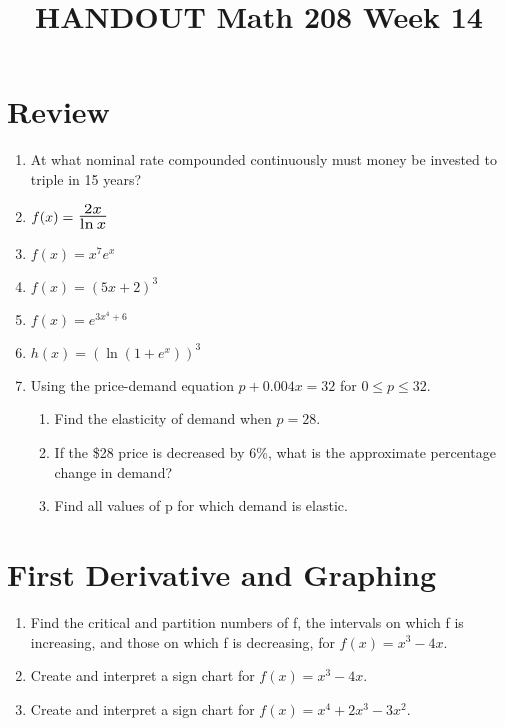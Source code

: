 \documentclass[14pt]{extarticle}
\title{\vspace{-5ex}HANDOUT Math 208 Week 14}
\date{\vspace{-10ex}}
\newcommand*{\Scale}[2][1.5]{\scalebox{#1}{\ensuremath{#2}}}%
\begin{document}
\maketitle		

\section{Review}
\begin{enumerate}
	\item At what nominal rate compounded continuously must money be invested to triple in 15 years?
	\vspace{3cm}

	\item $f(x) = \Scale[1.5]{\frac{2x}{\ln x}}$
	\vspace{4cm}
	
	\item $ f(x) = x^7e^x$
	\vspace{4cm}
	
	\item $f(x) = (5x+2)^3$
	\vspace{4cm}
	\cleardoublepage
	\item $f(x) = e^{3x^4+6}$
	\vspace{4cm}
	
	\item $h(x) = (\ln(1+e^x))^3$
	\vspace{5cm}
	
	\item Using the price-demand equation $p+0.004x = 32$ for $0 \leq p \leq 32$. 
	\begin{enumerate}
		\item Find the elasticity of demand when $p = 28$.
		\item If the \$28 price is decreased by 6\%, what is the approximate percentage change in demand?
		\item Find all values of p for which demand is elastic.
	\end{enumerate} 
	
\end{enumerate}
\vspace{5cm}

\cleardoublepage
\section{First Derivative and Graphing}

\begin{enumerate}
\item Find the critical and partition numbers of f, the intervals on which f is increasing, and those on which f is decreasing, for $f(x)=x^3-4x$.
\vspace{5cm}

\item  Create and interpret a sign chart for $f(x)=x^3-4x$.
\vspace{5cm}

\item Create and interpret a sign chart for $f(x)=x^4+2x^3 -3x^2$.
\vspace{3cm}
	
\end{enumerate}
\end{document}
